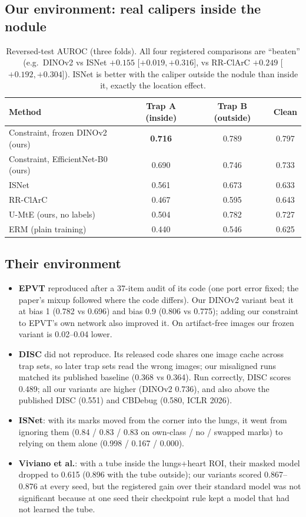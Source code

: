 \subsection{Our environment: real calipers inside the nodule}
\begin{table}[H]\centering\small
\begin{tabular}{lccc}\toprule
Method & Trap A (inside) & Trap B (outside) & Clean\\\midrule
Constraint, frozen DINOv2 (ours) & \textbf{0.716} & 0.789 & 0.797\\
Constraint, EfficientNet-B0 (ours) & 0.690 & 0.746 & 0.733\\
ISNet & 0.561 & 0.673 & 0.633\\
RR-ClArC & 0.467 & 0.595 & 0.643\\
U-MtE (ours, no labels) & 0.504 & 0.782 & 0.727\\
ERM (plain training) & 0.440 & 0.546 & 0.625\\\bottomrule
\end{tabular}
\caption{Reversed-test AUROC (three folds). All four registered comparisons are ``beaten'' (e.g.\ DINOv2 vs ISNet
$+0.155$ [$+0.019, +0.316$], vs RR-ClArC $+0.249$ [$+0.192, +0.304$]). ISNet is better with the caliper outside the
nodule than inside it, exactly the location effect.}
\end{table}

\subsection{Their environment}
\begin{itemize}[leftmargin=*]
\item \textbf{EPVT} reproduced after a 37-item audit of its code (one port error fixed; the paper's mixup followed where
the code differs). Our DINOv2 variant beat it at bias 1 (0.782 vs 0.696) and bias 0.9 (0.806 vs 0.775); adding our
constraint to EPVT's own network also improved it. On artifact-free images our frozen variant is 0.02--0.04 lower.
\item \textbf{DISC} did not reproduce. Its released code shares one image cache across trap sets, so later trap sets read
the wrong images; our misaligned runs matched its published baseline (0.368 vs 0.364). Run correctly, DISC scores 0.489;
all our variants are higher (DINOv2 0.736), and also above the published DISC (0.551) and CBDebug (0.580, ICLR 2026).
\item \textbf{ISNet}: with its marks moved from the corner into the lungs, it went from ignoring them (0.84 / 0.83 / 0.83
on own-class / no / swapped marks) to relying on them alone (0.998 / 0.167 / 0.000).
\item \textbf{Viviano et al.}: with a tube inside the lungs+heart ROI, their masked model dropped to 0.615 (0.896 with
the tube outside); our variants scored 0.867--0.876 at every seed, but the registered gain over their standard model was
not significant because at one seed their checkpoint rule kept a model that had not learned the tube.
\end{itemize}

